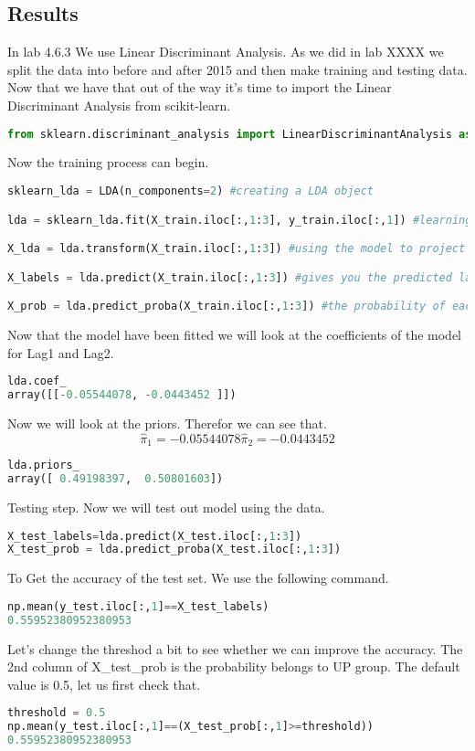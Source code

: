 \subsection{Results}
In lab 4.6.3 We use Linear Discriminant Analysis. As we did in lab XXXX we split the data into before and after 2015 and then make training and testing data. Now that we have that out of the way it's time to import the Linear Discriminant Analysis from scikit-learn.
\begin{lstlisting}[language=Python]
from sklearn.discriminant_analysis import LinearDiscriminantAnalysis as LDA
\end{lstlisting}

Now the training process can begin.

\begin{lstlisting}[language=Python]
sklearn_lda = LDA(n_components=2) #creating a LDA object

lda = sklearn_lda.fit(X_train.iloc[:,1:3], y_train.iloc[:,1]) #learning the projection matrix

X_lda = lda.transform(X_train.iloc[:,1:3]) #using the model to project X. Project data to maximize class separation.

X_labels = lda.predict(X_train.iloc[:,1:3]) #gives you the predicted label for each sample

X_prob = lda.predict_proba(X_train.iloc[:,1:3]) #the probability of each sample to belong to each class
\end{lstlisting}
Now that the model have been fitted we will look at the coefficients of the model for Lag1 and Lag2.
\begin{lstlisting}[language=Python]
lda.coef_
array([[-0.05544078, -0.0443452 ]])
\end{lstlisting}
Now we will look at the priors. Therefor we can see that. $$ \hat{ \pi }_1 = -0.05544078  \hat{ \pi }_2 = -0.0443452 $$ 
\begin{lstlisting}[language=Python]
lda.priors_
array([ 0.49198397,  0.50801603])
\end{lstlisting}

Testing step. Now we will test out model using the data.
\begin{lstlisting}[language=Python]
X_test_labels=lda.predict(X_test.iloc[:,1:3])
X_test_prob = lda.predict_proba(X_test.iloc[:,1:3])
\end{lstlisting}

To Get the accuracy of the test set. We use the following command.

\begin{lstlisting}[language=Python]
np.mean(y_test.iloc[:,1]==X_test_labels)
0.55952380952380953
\end{lstlisting}

Let's change the threshod a bit to see whether we can improve the accuracy. The 2nd column of X\_test\_prob is the probability belongs to UP group. The default value is 0.5, let us first check that.

\begin{lstlisting}[language=Python]
threshold = 0.5 
np.mean(y_test.iloc[:,1]==(X_test_prob[:,1]>=threshold))
0.55952380952380953
\end{lstlisting}

